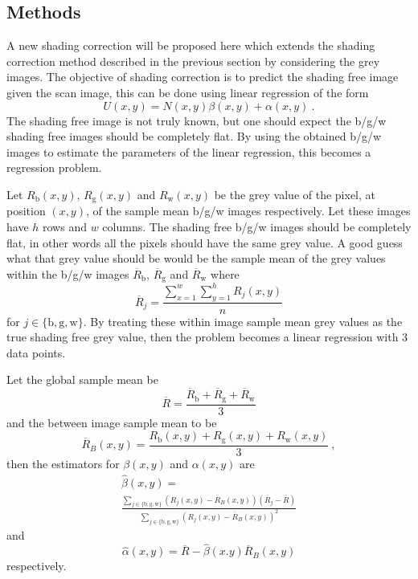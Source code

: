\documentclass[a4paper]{proc}
\begin{document}
\subsection{Methods}
A new shading correction will be proposed here which extends the shading correction method described in the previous section by considering the grey images. The objective of shading correction is to predict the shading free image given the scan image, this can be done using linear regression of the form
\begin{equation}
U(x,y) = N(x,y)\beta(x,y)+\alpha(x,y) \ .
\end{equation}
The shading free image is not truly known, but one should expect the b/g/w shading free images should be completely flat. By using the obtained b/g/w images to estimate the parameters of the linear regression, this becomes a regression problem.

Let $R_\text{b}(x,y)$, $R_\text{g}(x,y)$ and $R_\text{w}(x,y)$ be the grey value of the pixel, at position $(x,y)$, of the sample mean b/g/w images respectively. Let these images have $h$ rows and $w$ columns. The shading free b/g/w images should be completely flat, in other words all the pixels should have the same grey value. A good guess what that grey value should be would be the sample mean of the grey values within the b/g/w images $\overline{R}_\text{b}$, $\overline{R}_\text{g}$ and $\overline{R}_\text{w}$ where
\begin{equation}
\overline{R}_j=\frac{\sum_{x=1}^w\sum_{y=1}^hR_j(x,y)}{n}
\end{equation}
for $j\in\{\text{b},\text{g},\text{w}\}$. By treating these within image sample mean grey values as the true shading free grey value, then the problem becomes a linear regression with 3 data points.

Let the global sample mean be
\begin{equation}
\overline{R}=\frac{\overline{R}_\text{b} + \overline{R}_\text{g} + \overline{R}_\text{w}}{3}
\end{equation}
and the between image sample mean to be
\begin{equation}
\overline{R}_B(x,y)=\frac{R_\text{b}(x,y) + R_\text{g}(x,y) + R_\text{w}(x,y)}{3} \ ,
\end{equation}
then the estimators for $\beta(x,y)$ and $\alpha(x,y)$ are
\begin{multline}
\widehat{\beta}(x,y)=
\\
\frac{\sum_{j\in\{\text{b},\text{g},\text{w}\}}\left(R_j(x,y)-\overline{R}_B(x,y)\right)\left(\overline{R}_j-\overline{R}\right)}{\sum_{j\in\{\text{b},\text{g},\text{w}\}}\left(R_j(x,y)-\overline{R}_B(x,y)\right)^2}
\end{multline}
and
\begin{equation}
\widehat{\alpha}(x,y) = \overline{R}-\widehat{\beta}(x.y)\overline{R}_B(x,y) 
\end{equation}
respectively.
\end{document}
